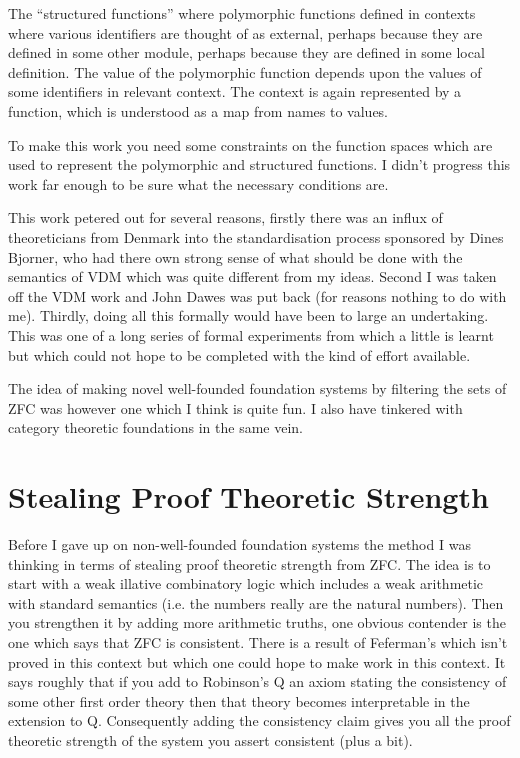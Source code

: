 \documentclass[10pt,titlepage]{book}
\begin{document}
The ``structured functions'' where polymorphic functions defined in contexts where various identifiers are thought of as external, perhaps because they are defined in some other module, perhaps because they are defined in some local definition.
The value of the polymorphic function depends upon the values of some identifiers in relevant context.
The context is again represented by a function, which is understood as a map from names to values.

To make this work you need some constraints on the function spaces which are used to represent the polymorphic and structured functions.
I didn't progress this work far enough to be sure what the necessary conditions are.

This work petered out for several reasons, firstly there was an influx of theoreticians from Denmark into the standardisation process sponsored by Dines Bjorner, who had there own strong sense of what should be done with the semantics of VDM which was quite different from my ideas.
Second I was taken off the VDM work and John Dawes was put back (for reasons nothing to do with me).
Thirdly, doing all this formally would have been to large an undertaking.
This was one of a long series of formal experiments from which a little is learnt but which could not hope to be completed with the kind of effort available.

The idea of making novel well-founded foundation systems by filtering the sets of ZFC was however one which I think is quite fun.
I also have tinkered with category theoretic foundations in the same vein.

\section{Stealing Proof Theoretic Strength}

Before I gave up on non-well-founded foundation systems the method I was thinking in terms of stealing proof theoretic strength from ZFC.
The idea is to start with a weak illative combinatory logic which includes a weak arithmetic with standard semantics (i.e. the numbers really are the natural numbers).
Then you strengthen it by adding more arithmetic truths, one obvious contender is the one which says that ZFC is consistent.
There is a result of Feferman's which isn't proved in this context but which one could hope to make work in this context.
It says roughly that if you add to Robinson's Q an axiom stating the consistency of some other first order theory then that theory becomes interpretable in the extension to Q.
Consequently adding the consistency claim gives you all the proof theoretic strength of the system you assert consistent (plus a bit).
\end{document}
